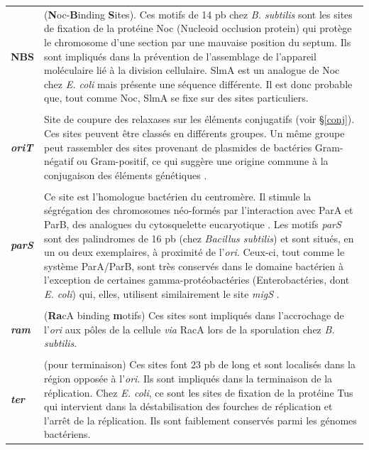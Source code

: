 \begin{longtable}{@{\hspace{-2cm}\hspace{1cm}} >{\bfseries}p{}  | >{\small}p{}}
	\\[-0.2cm]
	 NBS & (\textbf{N}oc-\textbf{B}inding \textbf{S}ites). Ces motifs de 14 pb chez \textit{B. subtilis} sont les sites de fixation de la protéine Noc (Nucleoid occlusion protein) qui protège le chromosome d'une section par une mauvaise position du septum. Ils sont impliqués dans la prévention de l'assemblage de l'appareil moléculaire lié à la division cellulaire. SlmA est un analogue de Noc chez \textit{E. coli} mais présente une séquence différente. Il est donc probable que, tout comme Noc, SlmA se fixe sur des sites particuliers.\\
	\\[-0.2cm]
	\textit{oriT} & Site de coupure des relaxases sur les éléments conjugatifs (voir \S \ref{conj}). Ces sites peuvent être classés en différents groupes. Un même groupe peut rassembler des sites provenant de plasmides de bactéries Gram-négatif ou Gram-positif, ce qui suggère une origine commune à la conjugaison des éléments génétiques \citep{lawley2004bacterial}.\\
	\\[-0.2cm]
	\textit{parS} & Ce site est l'homologue bactérien du centromère. Il stimule la ségrégation des chromosomes néo-formés par l'interaction avec ParA et ParB, des analogues du cytosquelette eucaryotique \citep{Livny2007}. Les motifs \textit{parS} sont des palindromes de 16 pb (chez \textit{Bacillus subtilis}) et sont situés, en un ou deux exemplaires, à proximité de l'\textit{ori}. Ceux-ci, tout comme le système ParA/ParB, sont très conservés dans le domaine bactérien à l'exception de certaines gamma-protéobactéries (Enterobactéries, dont \textit{E. coli}) qui, elles, utilisent similairement le site \textit{migS} \citep{Livny2007,Mierzejewska2012}.\\
	\\[-0.2cm]
	 \textit{ram} & (\textbf{Ra}cA binding \textbf{m}otifs) Ces sites sont impliqués dans l'accrochage de l'\textit{ori} aux pôles de la cellule \textit{via} RacA lors de la sporulation chez \textit{B. subtilis}.\\
	\\[-0.2cm]
	 \textit{ter} & (pour terminaison) Ces sites font 23 pb de long et sont localisés dans la région opposée à l'\textit{ori}. Ils sont impliqués dans la terminaison de la réplication. Chez \textit{E. coli}, ce sont les sites de fixation de la protéine Tus qui intervient dans la déstabilisation des fourches de réplication et l'arrêt de la réplication. Ils sont faiblement conservés parmi les génomes bactériens.\\
	\end{longtable}

